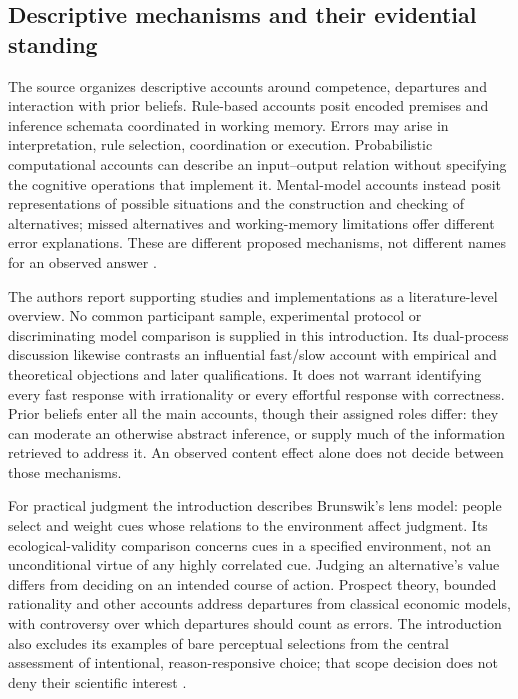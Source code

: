 \subsection{Descriptive mechanisms and their evidential standing}

The source organizes descriptive accounts around competence, departures
and interaction with prior beliefs. Rule-based accounts posit encoded
premises and inference schemata coordinated in working memory.
Errors may arise in interpretation, rule selection, coordination or
execution. Probabilistic computational accounts can describe an
input--output relation without specifying the cognitive operations
that implement it. Mental-model accounts instead posit representations
of possible situations and the construction and checking of alternatives;
missed alternatives and working-memory limitations offer different
error explanations. These are different proposed mechanisms, not
different names for an observed answer
\cite[pp.~21--23]{KnauffSpohn2021FrameworksIntro}.

The authors report supporting studies and implementations as a
literature-level overview. No common participant sample, experimental
protocol or discriminating model comparison is supplied in this
introduction. Its dual-process discussion likewise contrasts an
influential fast/slow account with empirical and theoretical objections
and later qualifications. It does not warrant identifying every fast
response with irrationality or every effortful response with correctness.
Prior beliefs enter all the main accounts, though their assigned roles
differ: they can moderate an otherwise abstract inference, or supply
much of the information retrieved to address it. An observed content
effect alone does not decide between those mechanisms.

For practical judgment the introduction describes Brunswik's lens
model: people select and weight cues whose relations to the environment
affect judgment. Its ecological-validity comparison concerns cues in a
specified environment, not an unconditional virtue of any highly
correlated cue. Judging an alternative's value differs from deciding
on an intended course of action. Prospect theory, bounded rationality
and other accounts address departures from classical economic models,
with controversy over which departures should count as errors. The
introduction also excludes its examples of bare perceptual selections
from the central assessment of intentional, reason-responsive choice;
that scope decision does not deny their scientific interest
\cite[pp.~23--24]{KnauffSpohn2021FrameworksIntro}.

